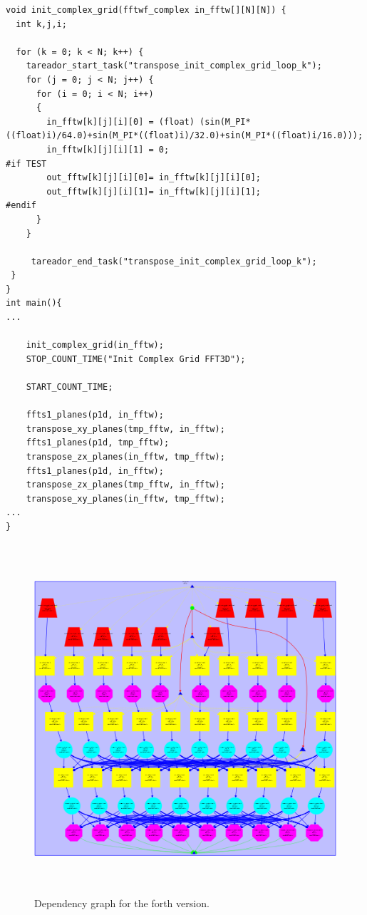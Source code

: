 \documentclass[12]{article}
\begin{document}
\begin{lstlisting}
void init_complex_grid(fftwf_complex in_fftw[][N][N]) {
  int k,j,i;

  for (k = 0; k < N; k++) {
    tareador_start_task("transpose_init_complex_grid_loop_k");
    for (j = 0; j < N; j++) {
      for (i = 0; i < N; i++)
      {
        in_fftw[k][j][i][0] = (float) (sin(M_PI*((float)i)/64.0)+sin(M_PI*((float)i)/32.0)+sin(M_PI*((float)i/16.0)));
        in_fftw[k][j][i][1] = 0;
#if TEST
        out_fftw[k][j][i][0]= in_fftw[k][j][i][0];
        out_fftw[k][j][i][1]= in_fftw[k][j][i][1];
#endif
      }
    }
 
     tareador_end_task("transpose_init_complex_grid_loop_k"); 
 }
}
int main(){
...

    init_complex_grid(in_fftw);
    STOP_COUNT_TIME("Init Complex Grid FFT3D");

    START_COUNT_TIME;

    ffts1_planes(p1d, in_fftw);
    transpose_xy_planes(tmp_fftw, in_fftw);
    ffts1_planes(p1d, tmp_fftw);
    transpose_zx_planes(in_fftw, tmp_fftw);
    ffts1_planes(p1d, in_fftw);
    transpose_zx_planes(tmp_fftw, in_fftw);
    transpose_xy_planes(in_fftw, tmp_fftw);
...
}

\end{lstlisting}

\begin{figure}[H]
\centering  \includegraphics[width=\linewidth , height=13cm, width=13cm  ]{dependency_graph4.png}
  \caption{Dependency graph for the forth version.}
  \label{fig:Dependency4rth}
\end{figure}
\end{document}
